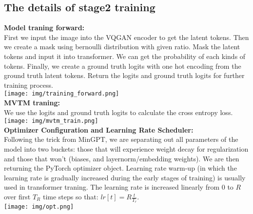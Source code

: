 \documentclass{article} %
\begin{document}
    \subsection{The details of stage2 training}
    \textbf{Model traning forward:} \\
    First we input the image into the VQGAN encoder to get the latent tokens.
    Then we create a mask using bernoulli distribution with given ratio.
    Mask the latent tokens and input it into transformer.
    We can get the probability of each kinds of tokens.
    Finally, we create a ground truth logits with one hot encoding from the ground truth latent tokens.
    Return the logits and ground truth logits for further training process.\\
    \texttt{[image: img/training\_forward.png]}\\
    \textbf{MVTM traning:}\\
    We use the logits and ground truth logits to calculate the cross entropy loss.\\
    \texttt{[image: img/mvtm\_train.png]}\\
    \textbf{Optimizer Configuration and Learning Rate Scheduler:}\\
    Following the trick from MinGPT, we are separating out all parameters of the model into two buckets: those that will experience
    weight decay for regularization and those that won't (biases, and layernorm/embedding weights).
    We are then returning the PyTorch optimizer object.
    Learning rate warm-up (in which the learning rate is gradually increased during the early stages of training) is usually used in transformer traning.
    The learning rate is increased linearly from 0 to $R$ over first $T_R$ time steps so that: $lr[t]=R\frac{t}{T_r}$.\\
    \texttt{[image: img/opt.png]}\\
\end{document}
